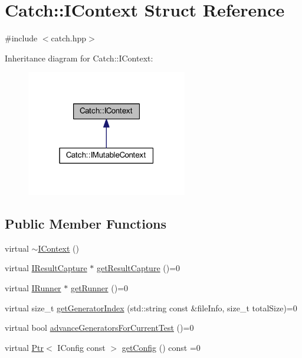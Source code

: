 \hypertarget{struct_catch_1_1_i_context}{}\section{Catch\+:\+:I\+Context Struct Reference}
\label{struct_catch_1_1_i_context}


{\ttfamily \#include $<$catch.\+hpp$>$}



Inheritance diagram for Catch\+:\+:I\+Context\+:\nopagebreak
\begin{figure}[H]
\begin{center}
\leavevmode
\includegraphics[width=199pt]{struct_catch_1_1_i_context__inherit__graph}
\end{center}
\end{figure}
\subsection*{Public Member Functions}
\begin{DoxyCompactItemize}
\item 
virtual \hyperlink{struct_catch_1_1_i_context_aeb17355c1be6c2ced5407cad7202628d}{$\sim$\+I\+Context} ()
\item 
virtual \hyperlink{struct_catch_1_1_i_result_capture}{I\+Result\+Capture} $\ast$ \hyperlink{struct_catch_1_1_i_context_a684e4ae71d1fdf3060c352ecde1d122f}{get\+Result\+Capture} ()=0
\item 
virtual \hyperlink{struct_catch_1_1_i_runner}{I\+Runner} $\ast$ \hyperlink{struct_catch_1_1_i_context_af088415dde18d039ed5a2f95b02767c6}{get\+Runner} ()=0
\item 
virtual size\+\_\+t \hyperlink{struct_catch_1_1_i_context_a43e07088db43299ba129fbe6d3106e95}{get\+Generator\+Index} (std\+::string const \&file\+Info, size\+\_\+t total\+Size)=0
\item 
virtual bool \hyperlink{struct_catch_1_1_i_context_a806f7c4ed24d51adae90418e661b24b7}{advance\+Generators\+For\+Current\+Test} ()=0
\item 
virtual \hyperlink{class_catch_1_1_ptr}{Ptr}$<$ I\+Config const  $>$ \hyperlink{struct_catch_1_1_i_context_aee81c415899262e096ad8d6f686fa365}{get\+Config} () const =0
\end{DoxyCompactItemize}


